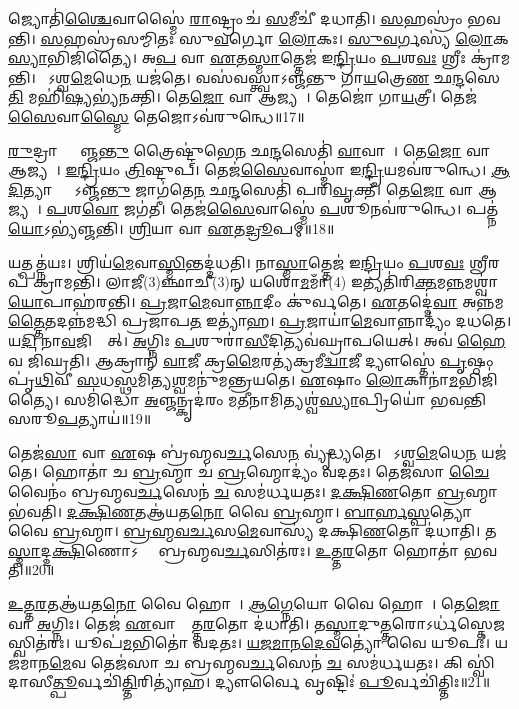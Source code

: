 𑌜𑍍𑌯𑍋𑌤𑌿॑\ul{𑌶𑍍𑌚𑍈}𑌵𑌾𑌸𑍍𑌮𑍈॑ \ul{𑌰𑌾}𑌷𑍍𑌟𑍍𑌰𑌂 𑌚॑ \ul{𑌸}𑌮𑍀𑌚𑍀॑ 𑌦𑌧𑌾𑌤𑌿।
\ul{𑌸}𑌹𑌸𑍍𑌰𑌂॑ 𑌭𑌵𑌨𑍍𑌤𑌿।
\ul{𑌸}𑌹𑌸𑍍𑌰॑𑌸𑌮𑍍𑌮𑌿𑌤𑌃 𑌸𑍁\ul{𑌵}𑌰𑍍𑌗𑍋 \ul{𑌲𑍋}𑌕𑌃।
\ul{𑌸𑍁}\ul{𑌵}𑌰𑍍𑌗𑌸𑍍𑌯॑ \ul{𑌲𑍋}𑌕\ul{𑌸𑍍𑌯𑌾}𑌭𑌿𑌜𑌿॑𑌤𑍍𑌯𑍈।
𑌅\ul{𑌪} 𑌵𑌾 \ul{𑌏}𑌤\ul{𑌸𑍍𑌮𑌾}𑌤𑍍𑌤𑍇𑌜॑ 𑌇\ul{𑌨𑍍𑌦𑍍𑌰𑌿}𑌯𑌂 \ul{𑌪}𑌶\ul{𑌵𑌃} 𑌶𑍍𑌰𑍀𑌃 𑌕𑍍𑌰𑌾॑𑌮𑌨𑍍𑌤𑌿।
𑌯𑍋᳚𑌽𑌶𑍍𑌵\ul{𑌮𑍇}𑌧𑍇\ul{𑌨} 𑌯𑌜॑𑌤𑍇।
𑌵𑌸॑𑌵𑌸𑍍𑌤𑍍𑌵𑌾\-𑌽𑌞𑍍𑌜𑌨𑍍𑌤𑍁 𑌗𑌾\ul{𑌯}𑌤𑍍𑌰𑍇\ul{𑌣} 𑌛\ul{𑌨𑍍𑌦}𑌸𑍇\ul{𑌤𑌿} 𑌮𑌹𑌿॑\ul{𑌷𑍍𑌯}𑌭𑍍𑌯॑𑌨𑌕𑍍𑌤𑌿।
𑌤𑍇\ul{𑌜𑍋} 𑌵𑌾 𑌆𑌜𑍍𑌯𑌮𑍍᳚।
𑌤𑍇𑌜𑍋॑ 𑌗𑌾\ul{𑌯}𑌤𑍍𑌰𑍀।
𑌤𑍇𑌜॑\ul{𑌸𑍈}𑌵𑌾\ul{𑌸𑍍𑌮𑍈} 𑌤𑍇𑌜𑍋\-𑌽𑌵॑𑌰𑍁𑌨𑍍𑌧𑍇॥17॥

\ul{𑌰𑍁}𑌦𑍍𑌰𑌾𑌸𑍍𑌤𑍍𑌵𑌾᳚𑌞𑍍𑌜\ul{𑌨𑍍𑌤𑍁} 𑌤𑍍𑌰𑍈𑌷𑍍𑌟𑍁॑𑌭𑍇\ul{𑌨} 𑌛\ul{𑌨𑍍𑌦}𑌸𑍇𑌤𑌿॑ \ul{𑌵𑌾}𑌵𑌾𑌤𑌾᳚।
𑌤𑍇\ul{𑌜𑍋} 𑌵𑌾 𑌆𑌜𑍍𑌯𑌮𑍍᳚।
\ul{𑌇}\ul{𑌨𑍍𑌦𑍍𑌰𑌿}𑌯𑌂 \ul{𑌤𑍍𑌰𑌿}𑌷𑍍𑌟𑍁𑌪𑍍।
𑌤𑍇𑌜॑\ul{𑌸𑍈}𑌵𑌾𑌸𑍍𑌮𑌾॑ 𑌇\ul{𑌨𑍍𑌦𑍍𑌰𑌿}𑌯𑌮𑌵॑𑌰𑍁𑌨𑍍𑌧𑍇।
\ul{𑌆}\ul{𑌦𑌿}𑌤𑍍𑌯𑌾𑌸𑍍𑌤𑍍𑌵𑌾᳚\-𑌽𑌞𑍍𑌜\ul{𑌨𑍍𑌤𑍁} 𑌜𑌾𑌗॑𑌤𑍇\ul{𑌨} 𑌛\ul{𑌨𑍍𑌦}𑌸𑍇𑌤𑌿॑ 𑌪𑌰𑌿\ul{𑌵𑍃}𑌕𑍍𑌤𑍀।
𑌤𑍇\ul{𑌜𑍋} 𑌵𑌾 𑌆𑌜𑍍𑌯𑌮𑍍᳚।
\ul{𑌪}𑌶\ul{𑌵𑍋} 𑌜𑌗॑𑌤𑍀।
𑌤𑍇𑌜॑\ul{𑌸𑍈}𑌵𑌾𑌸𑍍𑌮𑍇॑ \ul{𑌪}𑌶𑍂𑌨𑌵॑𑌰𑍁𑌨𑍍𑌧𑍇।
𑌪𑌤𑍍𑌨॑\ul{𑌯𑍋}\-𑌽𑌭𑍍𑌯॑𑌞𑍍𑌜𑌨𑍍𑌤𑌿।
\ul{𑌶𑍍𑌰𑌿}𑌯𑌾 𑌵𑌾 \ul{𑌏}𑌤\ul{𑌦𑍍𑌰𑍂}𑌪𑌮𑍍॥18॥

𑌯𑌤𑍍𑌪𑌤𑍍𑌨॑𑌯𑌃।
𑌶𑍍𑌰𑌿𑌯॑\ul{𑌮𑍇}𑌵𑌾\ul{𑌸𑍍𑌮𑌿}𑌨𑍍𑌤𑌦𑍍𑌦॑𑌧𑌤𑌿।
𑌨𑌾\ul{𑌸𑍍𑌮𑌾}𑌤𑍍𑌤𑍇𑌜॑ 𑌇\ul{𑌨𑍍𑌦𑍍𑌰𑌿}𑌯𑌂 \ul{𑌪}𑌶\ul{𑌵𑌃} 𑌶𑍍𑌰𑍀𑌰𑌪॑ 𑌕𑍍𑌰𑌾𑌮𑌨𑍍𑌤𑌿।
𑌲𑌾𑌜𑍀(3)𑌞𑍍𑌛𑌾𑌚𑍀(3)𑌨𑍍 𑌯𑌶𑍋॑\ul{𑌮}𑌮𑌾𑌁(4) 𑌇𑌤𑍍𑌯𑌤𑌿॑𑌰𑌿\ul{𑌕𑍍𑌤}𑌮\ul{𑌨𑍍𑌨}𑌮𑌶𑍍𑌵𑌾॑\ul{𑌯𑍋}𑌪𑌾𑌹॑𑌰𑌨𑍍𑌤𑌿।
\ul{𑌪𑍍𑌰}𑌜𑌾\ul{𑌮𑍇}𑌵𑌾\ul{𑌨𑍍𑌨𑌾}𑌦𑍀𑌂 𑌕𑍁॑𑌰𑍍𑌵𑌤𑍇।
\ul{𑌏}𑌤𑌦𑍍𑌦𑍇॑\ul{𑌵𑌾} 𑌅𑌨𑍍𑌨॑𑌮\ul{𑌤𑍍𑌤𑍈}𑌤𑌦𑌨𑍍𑌨॑𑌮𑌦𑍍𑌧𑌿 𑌪𑍍𑌰𑌜𑌾𑌪\ul{𑌤} 𑌇𑌤𑍍𑌯𑌾॑𑌹।
\ul{𑌪𑍍𑌰}𑌜𑌾𑌯𑌾॑\ul{𑌮𑍇}𑌵𑌾𑌨𑍍𑌨𑌾𑌦𑍍𑌯𑌂॑ 𑌦𑌧𑌤𑍇।
𑌯\ul{𑌦𑌿} 𑌨𑌾\ul{𑌵}𑌜𑌿𑌘𑍍𑌰𑍇᳚𑌤𑍍।
\ul{𑌅}𑌗𑍍𑌨𑌿𑌃 \ul{𑌪}𑌶𑍁𑌰𑌾॑\ul{𑌸𑍀}𑌦𑌿𑌤𑍍𑌯𑌵॑𑌘𑍍𑌰𑌾𑌪𑌯𑍇𑌤𑍍।
𑌅𑌵॑ \ul{𑌹𑍈}𑌵 𑌜𑌿॑𑌘𑍍𑌰𑌤𑌿।
𑌆𑌕𑍍𑌰𑌾𑌨𑍍॑ \ul{𑌵𑌾}𑌜𑍀 𑌕𑍍𑌰\ul{𑌮𑍈}𑌰𑌤𑍍𑌯॑𑌕𑍍𑌰𑌮𑍀\ul{𑌦𑍍𑌵𑌾}𑌜𑍀 𑌦𑍍𑌯𑍗𑌸𑍍𑌤𑍇॑ \ul{𑌪𑍃}𑌷𑍍𑌠𑌂 𑌪𑍃॑\ul{𑌥𑌿}𑌵𑍀 \ul{𑌸}𑌧\ul{𑌸𑍍𑌥}𑌮𑌿𑌤𑍍𑌯\ul{𑌶𑍍𑌵}𑌮𑌨𑍁॑𑌮𑌨𑍍𑌤𑍍𑌰𑌯𑌤𑍇।
\ul{𑌏}𑌷𑌾𑌂 \ul{𑌲𑍋}𑌕𑌾𑌨𑌾॑\ul{𑌮}𑌭𑌿𑌜𑌿॑𑌤𑍍𑌯𑍈।
𑌸𑌮𑌿॑𑌦𑍍𑌧𑍋 \ul{𑌅}𑌞𑍍𑌜𑌨𑍍𑌕𑍃𑌦॑𑌰𑌂 𑌮\ul{𑌤𑍀}𑌨𑌾𑌮𑌿𑌤𑍍𑌯𑌶𑍍𑌵॑\ul{𑌸𑍍𑌯𑌾}𑌪𑍍𑌰𑌿𑌯𑍋॑ 𑌭𑌵𑌨𑍍𑌤𑌿 𑌸𑌰𑍂\ul{𑌪}𑌤𑍍𑌯𑌾𑌯॑॥19॥\anuvakamend[𑌪𑌰𑌿॑\ul{𑌤}𑌸𑍍𑌥𑍁\ul{𑌷} 𑌇𑌤𑍍𑌯𑌾॑\ul{𑌹𑍇}𑌮𑍇 \ul{𑌏}𑌵𑌾𑌸𑍍𑌮𑍈॑ 𑌯𑍁𑌨\ul{𑌕𑍍𑌤𑍍𑌯}𑌭𑌿𑌜𑌿॑𑌤𑍍𑌯𑍈 𑌭𑌰𑌨𑍍𑌤𑍍𑌯𑌶𑍍𑌵\ul{𑌮𑍇}𑌧𑍋 𑌰𑍁॑𑌨𑍍𑌧𑍇 \ul{𑌰𑍂}𑌪𑌞𑍍𑌜𑌿॑𑌘𑍍𑌰\ul{𑌤𑌿} 𑌤𑍍𑌰𑍀𑌣𑌿॑ 𑌚]

𑌤𑍇𑌜॑\ul{𑌸𑌾} 𑌵𑌾 \ul{𑌏}𑌷 𑌬𑍍𑌰॑𑌹𑍍𑌮𑌵\ul{𑌰𑍍𑌚}𑌸𑍇\ul{𑌨} 𑌵𑍍𑌯𑍃॑𑌦𑍍𑌧𑍍𑌯𑌤𑍇।
𑌯𑍋᳚𑌽𑌶𑍍𑌵\ul{𑌮𑍇}𑌧𑍇\ul{𑌨} 𑌯𑌜॑𑌤𑍇।
𑌹𑍋𑌤𑌾॑ 𑌚 \ul{𑌬𑍍𑌰}𑌹𑍍𑌮𑌾 𑌚॑ \ul{𑌬𑍍𑌰}𑌹𑍍𑌮𑍋𑌦𑍍𑌯𑌂॑ 𑌵𑌦𑌤𑌃।
𑌤𑍇𑌜॑𑌸𑌾 \ul{𑌚𑍈}𑌵𑍈𑌨𑌂॑ 𑌬𑍍𑌰𑌹𑍍𑌮𑌵\ul{𑌰𑍍𑌚}𑌸𑍇𑌨॑ \ul{𑌚} 𑌸𑌮॑𑌰𑍍𑌧𑌯𑌤𑌃।
\ul{𑌦}\ul{𑌕𑍍𑌷𑌿}\ul{𑌣}𑌤𑍋 \ul{𑌬𑍍𑌰}𑌹𑍍𑌮𑌾 𑌭॑𑌵𑌤𑌿।
\ul{𑌦}\ul{𑌕𑍍𑌷𑌿}\ul{𑌣}𑌤𑌆॑𑌯𑌤\ul{𑌨𑍋} 𑌵𑍈 \ul{𑌬𑍍𑌰}𑌹𑍍𑌮𑌾।
\ul{𑌬𑌾}\ul{𑌰𑍍}\ul{𑌹}\ul{𑌸𑍍𑌪}𑌤𑍍𑌯𑍋 𑌵𑍈 \ul{𑌬𑍍𑌰}𑌹𑍍𑌮𑌾।
\ul{𑌬𑍍𑌰}\ul{𑌹𑍍𑌮}\ul{𑌵}\ul{𑌰𑍍𑌚}𑌸\ul{𑌮𑍇}𑌵𑌾𑌸𑍍𑌯॑ 𑌦𑌕𑍍𑌷𑌿\ul{𑌣}𑌤𑍋 𑌦॑𑌧𑌾𑌤𑌿।
𑌤\ul{𑌸𑍍𑌮𑌾}𑌦𑍍𑌦\ul{𑌕𑍍𑌷𑌿}𑌣𑍋\-𑌽𑌰𑍍𑌧𑍋᳚ 𑌬𑍍𑌰𑌹𑍍𑌮𑌵\ul{𑌰𑍍𑌚}𑌸𑌿𑌤॑𑌰𑌃।
\ul{𑌉}\ul{𑌤𑍍𑌤}\ul{𑌰}𑌤𑍋 𑌹𑍋𑌤𑌾॑ 𑌭𑌵𑌤𑌿॥20॥

\ul{𑌉}\ul{𑌤𑍍𑌤}\ul{𑌰}𑌤𑌆॑𑌯𑌤\ul{𑌨𑍋} 𑌵𑍈 𑌹𑍋𑌤𑌾᳚।
\ul{𑌆}\ul{𑌗𑍍𑌨𑍇}𑌯𑍋 𑌵𑍈 𑌹𑍋𑌤𑌾᳚।
𑌤𑍇\ul{𑌜𑍋} 𑌵𑌾 \ul{𑌅}𑌗𑍍𑌨𑌿𑌃।
𑌤𑍇𑌜॑ \ul{𑌏}𑌵𑌾𑌸𑍍𑌯𑍋᳚𑌤𑍍𑌤\ul{𑌰}𑌤𑍋 𑌦॑𑌧𑌾𑌤𑌿।
𑌤\ul{𑌸𑍍𑌮𑌾}𑌦𑍁\ul{𑌤𑍍𑌤}𑌰𑍋\-𑌽𑌰𑍍𑌧॑𑌸𑍍𑌤𑍇\ul{𑌜}𑌸𑍍𑌵𑌿𑌤॑𑌰𑌃।
𑌯𑍂𑌪॑\ul{𑌮}𑌭𑌿𑌤𑍋॑ 𑌵𑌦𑌤𑌃।
\ul{𑌯}\ul{𑌜}\ul{𑌮𑌾}\ul{𑌨}\ul{𑌦𑍇}\ul{𑌵}𑌤𑍍𑌯𑍋॑ 𑌵𑍈 𑌯𑍂𑌪𑌃॑।
𑌯𑌜॑𑌮𑌾𑌨\ul{𑌮𑍇}𑌵 𑌤𑍇𑌜॑𑌸𑌾 𑌚 𑌬𑍍𑌰𑌹𑍍𑌮𑌵\ul{𑌰𑍍𑌚}𑌸𑍇𑌨॑ \ul{𑌚} 𑌸𑌮॑𑌰𑍍𑌧𑌯𑌤𑌃।
𑌕𑌿 𑌸𑍍𑌵𑌿॑𑌦𑌾𑌸𑍀\ul{𑌤𑍍𑌪𑍂}𑌰𑍍𑌵𑌚𑌿॑\ul{𑌤𑍍𑌤𑌿}𑌰𑌿𑌤𑍍𑌯𑌾॑𑌹।
𑌦𑍍𑌯𑍗𑌰𑍍𑌵𑍈 𑌵𑍃𑌷𑍍𑌟𑌿𑌃॑ \ul{𑌪𑍂}𑌰𑍍𑌵𑌚𑌿॑𑌤𑍍𑌤𑌿𑌃॥21॥

